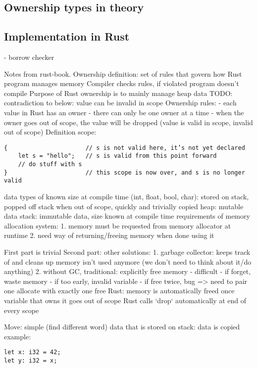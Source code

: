 \documentclass[sigplan,11pt,nonacm]{acmart}
\begin{document}
\subsection{Ownership types in theory}


\subsection{Implementation in Rust}
- borrow checker

Notes from rust-book\cite{rust-book}.
Ownership definition: set of rules that govern how Rust program manages memory
Compiler checks rules, if violated program doesn't compile
Purpose of Rust ownership is to mainly manage heap data
TODO: contradiction to below: value can be invalid in scope
Ownership rules:
- each value in Rust has an owner
- there can only be one owner at a time
- when the owner goes out of scope, the value will be dropped (value is valid in scope, invalid out of scope)
Definition scope:

\begin{lstlisting}
{                      // s is not valid here, it’s not yet declared
    let s = "hello";   // s is valid from this point forward
    // do stuff with s
}                      // this scope is now over, and s is no longer valid
\end{lstlisting}

data types of known size at compile time (int, float, bool, char): stored on stack, popped off stack when out of scope, quickly and trivially copied
heap: mutable data
stack: immutable data, size known at compile time
requirements of memory allocation system:
1. memory must be requested from memory allocator at runtime
2. need way of returning/freeing memory when done using it

First part is trivial
Second part: other solutions:
1. garbage collector: keeps track of and cleans up memory isn't used anymore (we don't need to think about it/do anything)
2. without GC, traditional: explicitly free memory
- difficult
- if forget, waste memory
- if too early, invalid variable
- if free twice, bug
=> need to pair one allocate with exactly one free
Rust: memory is automatically freed once variable that owns it goes out of scope
Rust calls `drop` automatically at end of every scope

Move:
simple (find different word) data that is stored on stack: data is copied
example:
\begin{lstlisting}
let x: i32 = 42;
let y: i32 = x;
\end{lstlisting}
\end{document}
